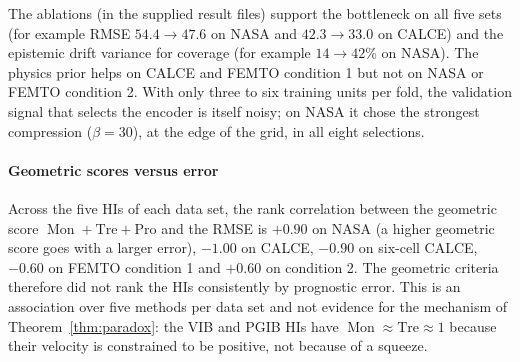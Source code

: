 \documentclass[preprint,12pt]{elsarticle}
\theoremstyle{definition}
\DeclareMathOperator{\Mon}{Mon}
\begin{document}
The ablations (in the supplied result files) support the bottleneck on all five sets (for example RMSE $54.4\to47.6$ on NASA and $42.3\to33.0$ on CALCE) and the epistemic drift variance for coverage (for example $14\to42\%$ on NASA). The physics prior helps on CALCE and FEMTO condition 1 but not on NASA or FEMTO condition 2. With only three to six training units per fold, the validation signal that selects the encoder is itself noisy; on NASA it chose the strongest compression ($\beta=30$), at the edge of the grid, in all eight selections.

\paragraph{Geometric scores versus error} Across the five HIs of each data set, the rank correlation between the geometric score $\Mon+\mathrm{Tre}+\mathrm{Pro}$ and the RMSE is $+0.90$ on NASA (a higher geometric score goes with a larger error), $-1.00$ on CALCE, $-0.90$ on six-cell CALCE, $-0.60$ on FEMTO condition 1 and $+0.60$ on condition 2. The geometric criteria therefore did not rank the HIs consistently by prognostic error. This is an association over five methods per data set and not evidence for the mechanism of Theorem~\ref{thm:paradox}: the VIB and PGIB HIs have $\Mon\approx\mathrm{Tre}\approx1$ because their velocity is constrained to be positive, not because of a squeeze.
\end{document}
